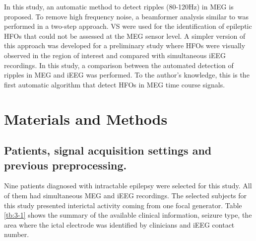 In this study, an automatic method to detect ripples (80-120Hz) in MEG is proposed. To remove high frequency noise, a beamformer analysis similar to \citep{vanKlink2015} was performed in a two-step approach. VS were used for the identification of epileptic HFOs that could not be assessed at the MEG sensor level. A simpler version of this approach was developed for a preliminary study \citep{Migliorelli2017b} where HFOs were visually observed in the region of interest and  compared with simultaneous iEEG recordings.  In this study, a comparison between the automated detection of ripples in MEG and iEEG was performed. To the author’s knowledge, this is the first automatic algorithm that detect HFOs in MEG time course signals. 

\section{Materials and Methods}

\subsection{Patients, signal acquisition settings and previous preprocessing.}

Nine patients diagnosed with intractable epilepsy were selected for this study. All of them had simultaneous MEG and iEEG recordings. The selected subjects for this study presented interictal activity coming from one focal generator. Table \ref{tb:3-1} shows the summary of the available clinical information, seizure type, the area where the ictal electrode was identified by clinicians and iEEG contact number. 

